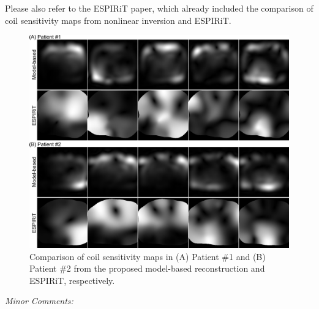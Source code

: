 \documentclass[a4paper,11pt]{report}
\begin{document}
\begin{enumerate}
\hspace{1em} Please also refer to the ESPIRiT paper, 
which already included the comparison of coil sensitivity maps 
from nonlinear inversion and ESPIRiT.

\begin{figure}[t]
	\centering
	\includegraphics[width=\textwidth]{../../figures/supp_tan3.png}
	\caption{Comparison of coil sensitivity maps in (A) Patient \#1 and (B) Patient \#2 
		from the proposed model-based reconstruction and ESPIRiT, respectively.}
	\label{SUPPFIG:SENS}
\end{figure}



\end{enumerate}

\noindent \textit{Minor Comments:}
\end{document}
